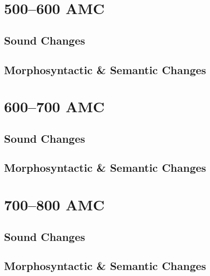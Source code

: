 \documentclass[a4paper,11pt,twoside,openany]{memoir}
\begin{document}


\section{500--600 AMC}

\subsection{Sound Changes}



\subsection{Morphosyntactic \& Semantic Changes}



\section{600--700 AMC}

\subsection{Sound Changes}



\subsection{Morphosyntactic \& Semantic Changes}



\section{700--800 AMC}

\subsection{Sound Changes}



\subsection{Morphosyntactic \& Semantic Changes}
\end{document}
